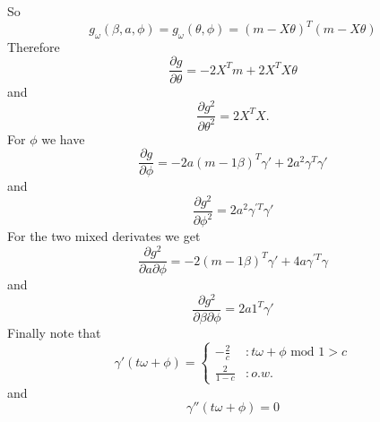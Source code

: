 \documentclass[12pt]{article}
\begin{document}
So
\begin{equation*}
g_\omega(\beta,a,\phi) = g_\omega(\theta,\phi) = (m - X\theta)^T(m - X\theta)
\end{equation*}
Therefore
\begin{equation*}
\frac{\partial g}{\partial \theta} = -2X^Tm + 2X^TX\theta
\end{equation*}
and
\begin{equation*}
\frac{\partial g^2}{\partial \theta^2} = 2X^TX.
\end{equation*}
For $\phi$ we have
\begin{equation*}
\frac{\partial g}{\partial \phi} = -2a(m - 1\beta)^T\gamma' + 2a^2\gamma^T\gamma'
\end{equation*}
and
\begin{equation*}
\frac{\partial g^2}{\partial \phi^2} = 2a^2\gamma^{'T}\gamma'
\end{equation*}
For the two mixed derivates we get
\begin{equation*}
\frac{\partial g^2}{\partial a \partial \phi} = -2(m-1\beta)^T\gamma' + 4a\gamma^{'T}\gamma
\end{equation*}
and
\begin{equation*}
\frac{\partial g^2}{\partial \beta \partial \phi} = 2a1^T\gamma'
\end{equation*}
Finally note that
\begin{equation*}
  \gamma'(t\omega + \phi) =    \left\{
  \begin{array}{lr}
     - \frac{2}{c} &:  t\omega + \phi \text{ mod } 1 > c\\ 
    \frac{2}{1-c}  &: o.w.
  \end{array} \right.
\end{equation*}
and
\begin{equation*}
  \gamma''(t\omega + \phi) =    0
\end{equation*}





%
%
\end{document}
